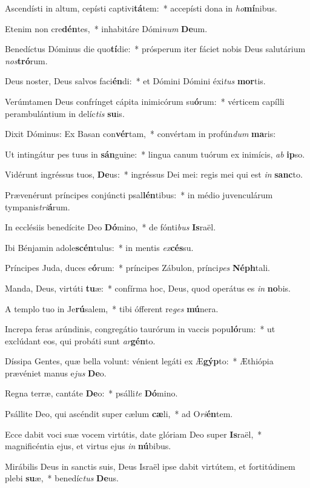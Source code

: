 \item Ascendísti in altum, cepísti captivi\textbf{tá}tem:~* accepísti dona in \textit{ho}\textbf{mí}nibus.
\item Etenim non cre\textbf{dén}tes,~* inhabitáre Dómi\textit{num} \textbf{De}um.
\item Benedíctus Dóminus die quo\textbf{tí}die:~* prósperum iter fáciet nobis Deus salutárium \textit{nos}\textbf{tró}rum.
\item Deus noster, Deus salvos faci\textbf{én}di:~* et Dómini Dómini éxi\textit{tus} \textbf{mor}tis.
\item Verúmtamen Deus confrínget cápita inimicórum su\textbf{ó}rum:~* vérticem capílli perambulántium in delíc\textit{tis} \textbf{su}is.
\item Dixit Dóminus: Ex Basan con\textbf{vér}tam,~* convértam in profún\textit{dum} \textbf{ma}ris:
\item Ut intingátur pes tuus in \textbf{sán}guine:~* lingua canum tuórum ex inimícis, \textit{ab} \textbf{ip}so.
\item Vidérunt ingréssus tuos, \textbf{De}us:~* ingréssus Dei mei: regis mei qui est \textit{in} \textbf{sanc}to.
\item Prævenérunt príncipes conjúncti psal\textbf{lén}tibus:~* in médio juvenculárum tympanis\textit{tri}\textbf{á}rum.
\item In ecclésiis benedícite Deo \textbf{Dó}mino,~* de fónti\textit{bus} \textbf{Is}raël.
\item Ibi Bénjamin adole\textbf{scén}tulus:~* in mentis \textit{ex}\textbf{cés}su.
\item Príncipes Juda, duces e\textbf{ó}rum:~* príncipes Zábulon, prínci\textit{pes} \textbf{Néph}tali.
\item Manda, Deus, virtúti \textbf{tu}æ:~* confírma hoc, Deus, quod operátus es \textit{in} \textbf{no}bis.
\item A templo tuo in Je\textbf{rú}salem,~* tibi ófferent re\textit{ges} \textbf{mú}nera.
\item Increpa feras arúndinis, congregátio taurórum in vaccis popu\textbf{ló}rum:~* ut exclúdant eos, qui probáti sunt \textit{ar}\textbf{gén}to.
\item Díssipa Gentes, quæ bella volunt: vénient legáti ex Æ\textbf{gýp}to:~* Æthiópia prævéniet manus e\textit{jus} \textbf{De}o.
\item Regna terræ, cantáte \textbf{De}o:~* psálli\textit{te} \textbf{Dó}mino.
\item Psállite Deo, qui ascéndit super cælum \textbf{cæ}li,~* ad O\textit{ri}\textbf{én}tem.
\item Ecce dabit voci suæ vocem virtútis, date glóriam Deo super \textbf{Is}raël,~* magnificéntia ejus, et virtus ejus \textit{in} \textbf{nú}bibus.
\item Mirábilis Deus in sanctis suis, Deus Israël ipse dabit virtútem, et fortitúdinem plebi \textbf{su}æ,~* benedíc\textit{tus} \textbf{De}us.
